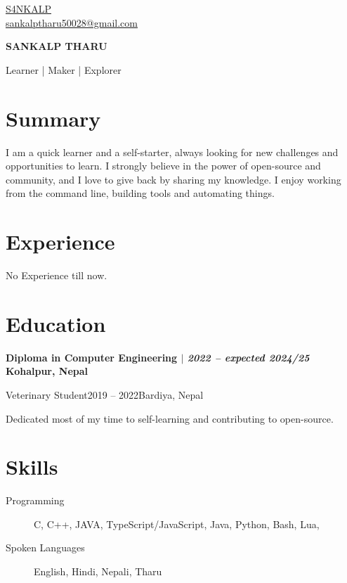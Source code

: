 \documentclass[11pt]{article} %
\newcommand{\uthree}[4]{
    {\large
        {\bfseries #1 $|$ \textit{#2} \hfill #3} \par
    }
    \begin{itemize}
        #4
    \end{itemize}
    \par\addvspace{2.5ex}%
}
\begin{document}
\begin{multicols}{3}
  \begin{flushleft}
    \color{gray}{\faGithub} \href{https://github.com/S4NKALP}{S4NKALP} \\
    \color{gray}{\faEnvelope} \href{mailto:sankalptharu50028@gmail.com}{sankalptharu50028@gmail.com} \\
  \end{flushleft}

\columnbreak

  \begin{center}
      {\huge\bfseries SANKALP THARU} \par
      Learner | Maker | Explorer \par
  \end{center}

\columnbreak

\end{multicols}

\section{Summary}
I am a quick learner and a self-starter, always looking for new challenges and opportunities to learn.
I strongly believe in the power of open-source and community, and I love to give back by sharing my knowledge.
I enjoy working from the command line, building tools and automating things.

\section{Experience}
No Experience till now.

\section{Education}
\uthree{Diploma in Computer Engineering}{2022 -- expected 2024/25}{Kohalpur, Nepal}
\uthree{Veterinary Student}{2019 -- 2022}{Bardiya, Nepal}{
    \item Dedicated most of my time to self-learning and contributing to open-source.
}

\section{Skills}
\begin{description}
  \item[Programming] C, C++, JAVA, TypeScript/JavaScript, Java, Python, Bash, Lua,
  \item[Spoken Languages] English, Hindi, Nepali, Tharu
\end{description}
\end{document}
